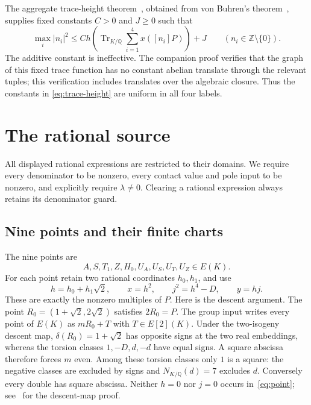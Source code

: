 \documentclass[11pt,a4paper]{article}
\newcommand{\Q}{\mathbb Q}\newcommand{\Z}{\mathbb Z}
\DeclareMathOperator{\Tr}{Tr}
\begin{document}
The aggregate trace-height theorem~\cite{Aggregate}, obtained from
von Buhren's theorem~\cite{VonBuhren}, supplies fixed constants
$C>0$ and $J\ge0$ such that
\begin{equation}\label{eq:trace-height}
 \max_i|n_i|^2\le C h\left(\Tr_{K/\Q}
              \sum_{i=1}^4x([n_i]P)\right)+J
 \qquad(n_i\in\Z\setminus\{0\}).
\end{equation}
The additive constant is ineffective. The companion proof verifies
that the graph of this fixed trace function has no constant abelian
translate through the relevant tuples; this verification includes
translates over the algebraic closure. Thus the constants in
\eqref{eq:trace-height} are uniform in all four labels.

\section{The rational source}

All displayed rational expressions are restricted to their domains.
We require every denominator to be nonzero, every contact value and
pole input to be nonzero, and explicitly require $\lambda\ne0$.
Clearing a rational expression always retains its denominator guard.

\subsection{Nine points and their finite charts}

The nine points are
\[
 A,S,T_1,Z,H_0,U_A,U_S,U_T,U_Z\in E(K).
\]
For each point retain two rational coordinates $h_0,h_1$, and use
\begin{equation}\label{eq:point}
 h=h_0+h_1\sqrt2,\qquad x=h^2,\qquad j^2=h^4-D,
 \qquad y=hj.
\end{equation}
These are exactly the nonzero multiples of $P$. Here is the descent
argument. The point $R_0=(1+\sqrt2,2\sqrt2)$ satisfies $2R_0=P$.
The group input writes every point of $E(K)$ as $mR_0+T$ with
$T\in E[2](K)$. Under the two-isogeny descent map,
$\delta(R_0)=1+\sqrt2$ has opposite signs at the two real embeddings,
whereas the torsion classes $1,-D,d,-d$ have equal signs. A square
abscissa therefore forces $m$ even. Among these torsion classes only
$1$ is a square: the negative classes are excluded by signs and
$N_{K/\Q}(d)=7$ excludes $d$. Conversely every double has square
abscissa. Neither $h=0$ nor $j=0$ occurs in~\eqref{eq:point};
see~\cite{SquareCharts} for the descent-map proof.
\end{document}
